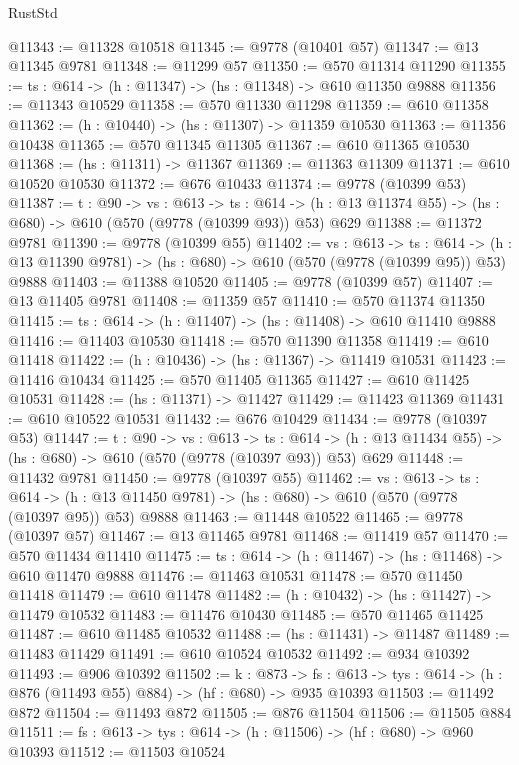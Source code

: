 \begin{lexlean}{RustStd}
\begin{coremodule}
@11343 := @11328 @10518
@11345 := @9778 (@10401 @57)
@11347 := @13 @11345 @9781
@11348 := @11299 @57
@11350 := @570 @11314 @11290
@11355 := {ts : @614} -> (h : @11347) -> (hs : @11348) -> @610 @11350 @9888
@11356 := @11343 @10529
@11358 := @570 @11330 @11298
@11359 := @610 @11358
@11362 := (h : @10440) -> (hs : @11307) -> @11359 @10530
@11363 := @11356 @10438
@11365 := @570 @11345 @11305
@11367 := @610 @11365 @10530
@11368 := (hs : @11311) -> @11367
@11369 := @11363 @11309
@11371 := @610 @10520 @10530
@11372 := @676 @10433
@11374 := @9778 (@10399 @53)
@11387 := {t : @90} ->
  {vs : @613} ->
  {ts : @614} -> (h : @13 @11374 @55) -> (hs : @680) -> @610 (@570 (@9778 (@10399 @93)) @53) @629
@11388 := @11372 @9781
@11390 := @9778 (@10399 @55)
@11402 := {vs : @613} ->
  {ts : @614} -> (h : @13 @11390 @9781) -> (hs : @680) -> @610 (@570 (@9778 (@10399 @95)) @53) @9888
@11403 := @11388 @10520
@11405 := @9778 (@10399 @57)
@11407 := @13 @11405 @9781
@11408 := @11359 @57
@11410 := @570 @11374 @11350
@11415 := {ts : @614} -> (h : @11407) -> (hs : @11408) -> @610 @11410 @9888
@11416 := @11403 @10530
@11418 := @570 @11390 @11358
@11419 := @610 @11418
@11422 := (h : @10436) -> (hs : @11367) -> @11419 @10531
@11423 := @11416 @10434
@11425 := @570 @11405 @11365
@11427 := @610 @11425 @10531
@11428 := (hs : @11371) -> @11427
@11429 := @11423 @11369
@11431 := @610 @10522 @10531
@11432 := @676 @10429
@11434 := @9778 (@10397 @53)
@11447 := {t : @90} ->
  {vs : @613} ->
  {ts : @614} -> (h : @13 @11434 @55) -> (hs : @680) -> @610 (@570 (@9778 (@10397 @93)) @53) @629
@11448 := @11432 @9781
@11450 := @9778 (@10397 @55)
@11462 := {vs : @613} ->
  {ts : @614} -> (h : @13 @11450 @9781) -> (hs : @680) -> @610 (@570 (@9778 (@10397 @95)) @53) @9888
@11463 := @11448 @10522
@11465 := @9778 (@10397 @57)
@11467 := @13 @11465 @9781
@11468 := @11419 @57
@11470 := @570 @11434 @11410
@11475 := {ts : @614} -> (h : @11467) -> (hs : @11468) -> @610 @11470 @9888
@11476 := @11463 @10531
@11478 := @570 @11450 @11418
@11479 := @610 @11478
@11482 := (h : @10432) -> (hs : @11427) -> @11479 @10532
@11483 := @11476 @10430
@11485 := @570 @11465 @11425
@11487 := @610 @11485 @10532
@11488 := (hs : @11431) -> @11487
@11489 := @11483 @11429
@11491 := @610 @10524 @10532
@11492 := @934 @10392
@11493 := @906 @10392
@11502 := {k : @873} ->
  {fs : @613} -> {tys : @614} -> (h : @876 (@11493 @55) @884) -> (hf : @680) -> @935 @10393
@11503 := @11492 @872
@11504 := @11493 @872
@11505 := @876 @11504
@11506 := @11505 @884
@11511 := {fs : @613} -> {tys : @614} -> (h : @11506) -> (hf : @680) -> @960 @10393
@11512 := @11503 @10524

\end{coremodule}
\end{lexlean}
